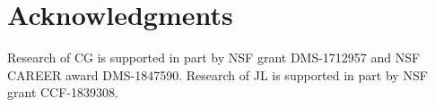 
\section*{Acknowledgments}

Research of CG is supported in part by NSF grant DMS-1712957 and NSF CAREER award DMS-1847590. Research of JL is supported in part by NSF grant CCF-1839308.
